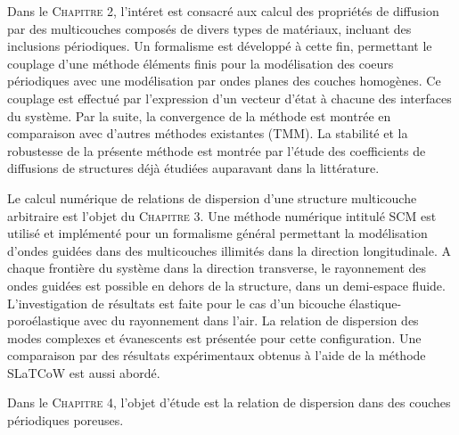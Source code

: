 Dans le \textsc{Chapitre 2}, l'intéret est consacré aux calcul des propriétés de diffusion par des multicouches composés de divers types de matériaux, incluant des inclusions périodiques. Un formalisme est développé à cette fin, permettant le couplage d'une méthode éléments finis pour la modélisation des coeurs périodiques avec une modélisation par ondes planes des couches homogènes. Ce couplage est effectué par l'expression d'un vecteur d'état à chacune des interfaces du système. 
Par la suite, la convergence de la méthode est montrée en comparaison avec d'autres méthodes existantes (TMM). La stabilité et la robustesse de la présente méthode est montrée par l'étude des coefficients de diffusions de structures déjà étudiées auparavant dans la littérature.

Le calcul numérique de relations de dispersion d'une structure multicouche arbitraire est l'objet du \textsc{Chapitre 3}. Une méthode numérique intitulé SCM est utilisé et implémenté pour un formalisme général permettant la modélisation d'ondes guidées dans des multicouches illimités dans la direction longitudinale. A chaque frontière du système dans la direction transverse, le rayonnement des ondes guidées est possible en dehors de la structure, dans un demi-espace fluide. L'investigation de résultats est faite pour le cas d'un bicouche élastique-poroélastique avec du rayonnement dans l'air. La relation de dispersion des modes complexes et évanescents est présentée pour cette configuration. Une comparaison par des résultats expérimentaux obtenus à l'aide de la méthode SLaTCoW est aussi abordé. 

Dans le \textsc{Chapitre 4}, l'objet d'étude est la relation de dispersion dans des couches périodiques poreuses. 